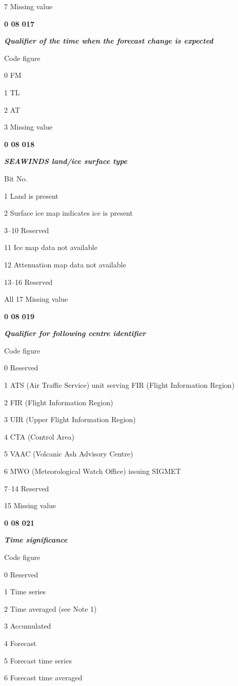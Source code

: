 7 Missing value

\textbf{0 08 017}

\emph{\textbf{Qualifier of the time when the forecast change is expected}}

Code figure

0 FM

1 TL

2 AT

3 Missing value

\textbf{0 08 018}

\emph{\textbf{SEAWINDS land/ice surface type}}

Bit No.

1 Land is present

2 Surface ice map indicates ice is present

3--10 Reserved

11 Ice map data not available

12 Attenuation map data not available

13--16 Reserved

All 17 Missing value

\textbf{0 08 019}

\emph{\textbf{Qualifier for following centre identifier}}

Code figure

0 Reserved

1 ATS (Air Traffic Service) unit serving FIR (Flight Information Region)

2 FIR (Flight Information Region)

3 UIR (Upper Flight Information Region)

4 CTA (Control Area)

5 VAAC (Volcanic Ash Advisory Centre)

6 MWO (Meteorological Watch Office) issuing SIGMET

7--14 Reserved

15 Missing value

\textbf{0 08 021}

\emph{\textbf{Time significance}}

Code figure

0 Reserved

1 Time series

2 Time averaged (see Note 1)

3 Accumulated

4 Forecast

5 Forecast time series

6 Forecast time averaged

